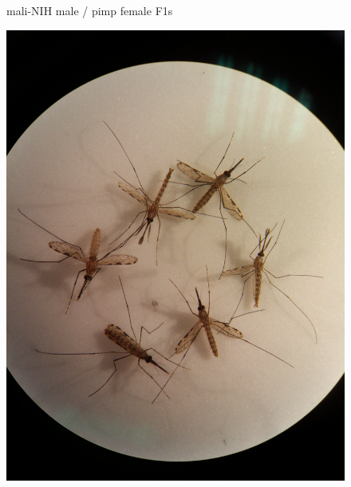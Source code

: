 \documentclass{article}
\begin{document}


\begin{figure}[p]

\begin{caption}
mali-NIH male / pimp female F1s
\end{caption}
\centering
\includegraphics[scale=0.1]{mali-NIH-♂_pimp-♀}
\end{figure}
\end{document}
